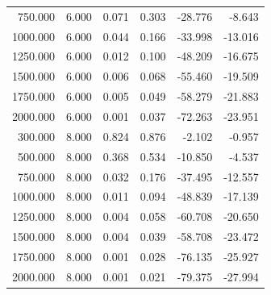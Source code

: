{\begin{longtable}{rrrrrr}
750.000 & 6.000 & 0.071 & 0.303 & -28.776 & -8.643 \\
1000.000 & 6.000 & 0.044 & 0.166 & -33.998 & -13.016 \\
1250.000 & 6.000 & 0.012 & 0.100 & -48.209 & -16.675 \\
1500.000 & 6.000 & 0.006 & 0.068 & -55.460 & -19.509 \\
1750.000 & 6.000 & 0.005 & 0.049 & -58.279 & -21.883 \\
2000.000 & 6.000 & 0.001 & 0.037 & -72.263 & -23.951 \\
300.000 & 8.000 & 0.824 & 0.876 & -2.102 & -0.957 \\
500.000 & 8.000 & 0.368 & 0.534 & -10.850 & -4.537 \\
750.000 & 8.000 & 0.032 & 0.176 & -37.495 & -12.557 \\
1000.000 & 8.000 & 0.011 & 0.094 & -48.839 & -17.139 \\
1250.000 & 8.000 & 0.004 & 0.058 & -60.708 & -20.650 \\
1500.000 & 8.000 & 0.004 & 0.039 & -58.708 & -23.472 \\
1750.000 & 8.000 & 0.001 & 0.028 & -76.135 & -25.927 \\
2000.000 & 8.000 & 0.001 & 0.021 & -79.375 & -27.994 \\
\end{longtable}
}